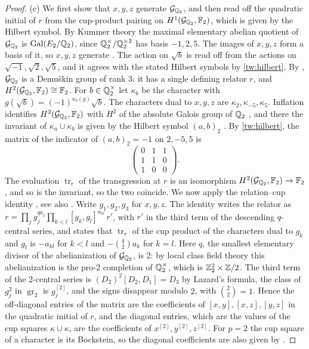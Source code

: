 \begin{proof}
(c) We first show that $x,y,z$ generate $\mathcal G_{\mathbb Q_2}$, and then read
off the quadratic initial of $r$ from the cup-product pairing on
$H^1(\mathcal G_{\mathbb Q_2},\mathbb F_2)$, which is given by the Hilbert symbol.
By Kummer theory the maximal elementary abelian quotient of
$\mathcal G_{\mathbb Q_2}$ is $\operatorname{Gal}(E_2/\mathbb Q_2)$, since $\mathbb Q_2^\times/\mathbb Q_2^{\times2}$
has basis $-1,2,5$. The images of $x,y,z$ form a basis of it, so $x,y,z$
generate \cite[Proposition~3.9.1]{NeukirchSchmidtWingberg2008}. The action on
$\sqrt b$ is read off from the actions on $\sqrt{-1},\sqrt2,\sqrt5$, and it
agrees with the stated Hilbert symbols by \eqref{tw:hilbert}. By
\cite[Theorem~7.5.11]{NeukirchSchmidtWingberg2008}, $\mathcal G_{\mathbb Q_2}$ is a
Demu\v skin group of rank $3$: it has a single defining relator $r$, and
$H^2(\mathcal G_{\mathbb Q_2},\mathbb F_2)\cong\mathbb F_2$. For $b\in\mathbb Q_2^\times$ let $\kappa_b$
be the character with $g(\sqrt b)=(-1)^{\kappa_b(g)}\sqrt b$. The characters
dual to $x,y,z$ are $\kappa_2,\kappa_{-5},\kappa_5$. Inflation identifies
$H^2(\mathcal G_{\mathbb Q_2},\mathbb F_2)$ with $H^2$ of the absolute Galois group of
$\mathbb Q_2$ \cite[Proposition~7.5.8]{NeukirchSchmidtWingberg2008}, and there the
invariant of $\kappa_a\cup\kappa_b$ is given by the Hilbert symbol $(a,b)_2$
\cite[Chapter~III, Section~4]{MilneCFT}. By \eqref{tw:hilbert}, the matrix of
the indicator of $(a,b)_2=-1$ on $2,-5,5$ is
\[
 \begin{pmatrix}0&1&1\\1&1&0\\1&0&0\end{pmatrix}.
\]
The evaluation $\operatorname{tr}_r$ of the transgression at $r$ is an
isomorphism $H^2(\mathcal G_{\mathbb Q_2},\mathbb F_2)\to\mathbb F_2$
\cite[Proposition~3.9.12(iii)]{NeukirchSchmidtWingberg2008}, and so is the
invariant, so the two coincide. We now apply the relation--cup identity
\cite[Proposition~3.9.13(ii)]{NeukirchSchmidtWingberg2008}, see also
\cite[Proposition~3.2]{Quadrelli2021}. Write $g_1,g_2,g_3$ for $x,y,z$. The
identity writes the relator as
$r=\prod_jg_j^{qa_j}\prod_{k<l}[g_k,g_l]^{a_{kl}}\,r'$, with $r'$ in the
third term of the descending $q$-central series, and states that
$\operatorname{tr}_r$ of the cup product of the characters dual to $g_k$ and
$g_l$ is $-a_{kl}$ for $k<l$ and $-\binom q2a_k$ for $k=l$. Here $q$, the
smallest elementary divisor of the
abelianization of $\mathcal G_{\mathbb Q_2}$, is $2$: by local class field theory
this abelianization is the pro-$2$ completion of $\mathbb Q_2^\times$, which is
$\mathbb Z_2^2\times\mathbb Z/2$. The third term of the $2$-central series is
$(D_2)^2[D_2,D_1]=D_3$ by Lazard's formula, the class of $g_j^2$ in
$\operatorname{gr}_2$ is $g_j^{[2]}$, and the signs disappear modulo $2$,
with $\binom22=1$. Hence the off-diagonal entries of the matrix are the
coefficients of $[x,y],[x,z],[y,z]$ in the quadratic initial of $r$, and the
diagonal entries, which are the values of the cup squares $\kappa\cup\kappa$,
are the coefficients of $x^{[2]},y^{[2]},z^{[2]}$. For $p=2$ the cup square
of a character is its Bockstein, so the diagonal coefficients are also given
by \cite[Proposition~3.9.14]{NeukirchSchmidtWingberg2008}.
\end{proof}

